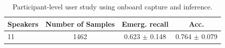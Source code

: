 \begin{table}[t]
    \centering
    \caption{Participant-level user study using onboard capture and inference.}
    \label{tab:participant_live_trials}
    \footnotesize
    \setlength{\tabcolsep}{4pt}
    \begin{tabular}{@{}lccc@{}}
        \toprule
        Speakers & Number of Samples & Emerg. recall & Acc. \\
        \midrule
        11 & 1462 & 0.623 $\pm$ 0.148 & 0.764 $\pm$ 0.079 \\
        \bottomrule
    \end{tabular}
\end{table}
